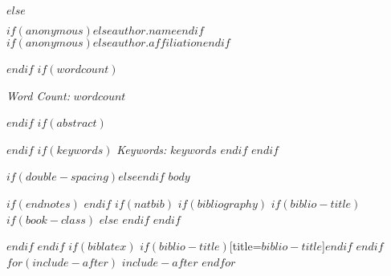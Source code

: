 \documentclass[twoside, $if(fontsize)$$fontsize$,$endif$$if(papersize)$$papersize$,$endif$$for(classoption)$$classoption$$sep$,$endfor$]{article}
\newcommand{\orcid}[1]{\href{https://orcid.org/#1}{\textcolor[HTML]{A6CE39}{\aiOrcid}}}
\newcommand{\openmaterials}[1]{\href{https://github.com/ajnafa/#1}{\textcolor[HTML]{000000}{\aiOpenMaterials}}} %
\begin{document}
	$else$
	\begin{flushleft}
		\vspace*{6pt}
		\fontsize{26pt}{26pt}\selectfont\textit{$if(anonymous)$$else$$author.name$$endif$}
		\fontsize{18pt}{18pt}\selectfont\orcid{$author.orcid$} \openmaterials{$github$} \\
		\vspace*{12pt}                                                                                  
		\fontsize{18pt}{18pt}\selectfont \textbf{$if(anonymous)$$else$$author.affiliation$$endif$}
	\end{flushleft}
	$endif$
	$if(wordcount)$
	\begin{center}
		\textit{Word Count:} $wordcount$
	\end{center}
	$endif$
	$if(abstract)$
	\begin{abstract}
		\noindent\normalsize $abstract$
	\end{abstract}
	$endif$
	\vspace*{8pt}
	$if(keywords)$
	\textit{Keywords:} \textit{$keywords$}
	$endif$
	\vspace*{10pt}
	$endif$
	
	$if(double-spacing)$\doublespacing$else$\onehalfspacing$endif$
	\fontsize{$fontsize$}{$fontsize$} $body$
	
	$if(endnotes)$
	\newpage
	\theendnotes
	$endif$
	\newpage
	\singlespacing
	$if(natbib)$
	$if(bibliography)$
	$if(biblio-title)$
	$if(book-class)$
	\renewcommand\bibname{$biblio-title$}
	$else$
	\renewcommand\refname{$biblio-title$}
	$endif$
	$endif$
	
	$endif$
	$endif$
	$if(biblatex)$
	\printbibliography$if(biblio-title)$[title=$biblio-title$]$endif$
	$endif$
	$for(include-after)$
	$include-after$
	$endfor$
	
\end{document}

